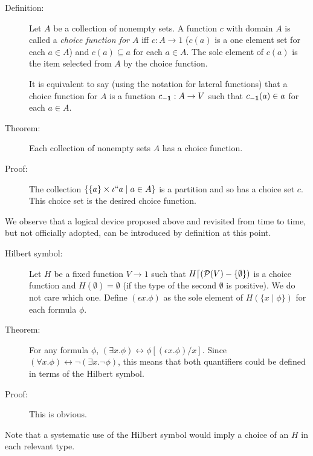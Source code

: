 \documentclass[12pt]{book}
\begin{document}
\begin{description}

\item[Definition:] Let $A$ be a collection of nonempty sets.  A function
$c$ with domain $A$ is called a {\em choice function for $A$\/} iff
$c:A \rightarrow 1$ ($c(a)$ is a one element set for each $a \in A$)
and $c(a) \subseteq a$ for each $a \in A$.  The sole element of $c(a)$
is the item selected from $A$ by the choice function.

It is equivalent to say (using the notation for lateral functions) that
a choice function for $A$ is a function $c_{\bf -1}:A \rightarrow V$ such
that $c_{\bf -1}(a) \in a$ for each $a \in A$.

\item[Theorem:]  Each collection of nonempty sets $A$ has a choice function.

\item[Proof:] The collection $\{\{a\} \times \iota``a \mid a
\in A\}$ is a partition and so has a choice set $c$.  This choice set
is the desired choice function.

\end{description}

We observe that a logical device proposed above and revisited from time to time, but not officially adopted, can be introduced by definition at this point.

\begin{description}

\item[Hilbert symbol:] Let $H$ be a fixed function $V \rightarrow 1$
such that $H \lceil ({\cal P}(V) - \{\emptyset\})$ is a choice function and $H(\emptyset) = \emptyset$ (if the type of the second $\emptyset$ is positive).  We do
not care which one.  Define $(\epsilon x.\phi)$ as the sole element of
$H(\{x \mid \phi\})$ for each formula $\phi$.

\item[Theorem:] For any formula $\phi$, $(\exists x.\phi) \leftrightarrow
\phi[(\epsilon x.\phi)/x]$.  Since $(\forall x.\phi) \leftrightarrow
\neg(\exists x.\neg \phi)$, this means that both quantifiers could be
defined in terms of the Hilbert symbol.

\item[Proof:]  This is obvious.

\end{description}

Note that a systematic use of the Hilbert symbol would imply a choice of
an $H$ in each relevant type.
\end{document}
